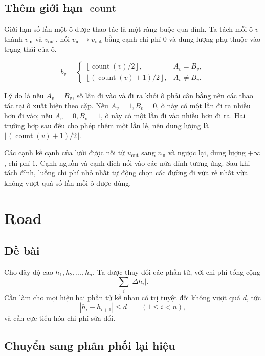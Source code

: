 \documentclass[11pt]{article}
\begin{document}
\subsection*{Thêm giới hạn \texorpdfstring{\(\operatorname{count}\)}{count}}

Giới hạn số lần một ô được thao tác là một ràng buộc qua đỉnh. Ta tách mỗi ô
$v$ thành $v_{\mathrm{in}}$ và $v_{\mathrm{out}}$, nối
$v_{\mathrm{in}}\to v_{\mathrm{out}}$ bằng cạnh chi phí $0$ và dung lượng
phụ thuộc vào trạng thái của ô.

\[
  b_v=
  \begin{cases}
    \left\lfloor \operatorname{count}(v)/2\right\rfloor,
      & A_v=B_v,\\[0.4em]
    \left\lfloor(\operatorname{count}(v)+1)/2\right\rfloor,
      & A_v\ne B_v.
  \end{cases}
\]

Lý do là nếu $A_v=B_v$, số lần đi vào và đi ra khỏi ô phải cân bằng nên các
thao tác tại ô xuất hiện theo cặp. Nếu $A_v=1,B_v=0$, ô này có một lần đi ra
nhiều hơn đi vào; nếu $A_v=0,B_v=1$, ô này có một lần đi vào nhiều hơn đi ra.
Hai trường hợp sau đều cho phép thêm một lần lẻ, nên dung lượng là
$\lfloor(\operatorname{count}(v)+1)/2\rfloor$.

Các cạnh kề cạnh của lưới được nối từ $u_{\mathrm{out}}$ sang
$v_{\mathrm{in}}$ và ngược lại, dung lượng $+\infty$, chi phí $1$. Cạnh nguồn
và cạnh đích nối vào các nửa đỉnh tương ứng. Sau khi tách đỉnh, luồng chi phí
nhỏ nhất tự động chọn các đường đi vừa rẻ nhất vừa không vượt quá số lần mỗi ô
được dùng.

\section{Road}

\subsection*{Đề bài}

Cho dãy độ cao $h_1,h_2,\ldots,h_n$. Ta được thay đổi các phần tử, với chi phí
tổng cộng
\[
  \sum_i |\Delta h_i|.
\]
Cần làm cho mọi hiệu hai phần tử kề nhau có trị tuyệt đối không vượt quá $d$,
tức
\[
  |h_i-h_{i+1}|\le d \qquad (1\le i<n),
\]
và cần cực tiểu hóa chi phí sửa đổi.

\subsection*{Chuyển sang phân phối lại hiệu}
\end{document}
